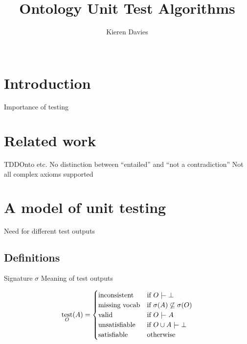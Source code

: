 \documentclass[draft]{sig-alternate}
\newcommand{\union}{\cup}
\newcommand{\sementails}{\mathrel{|}\joinrel\mkern-.5mu\mathrel{-}}
\newcommand{\signature}{\sigma}
\DeclareMathOperator{\test}{test}
\begin{document}
\title{Ontology Unit Test Algorithms}
\author{
  \alignauthor
  Kieren Davies\\
   \\
}
\maketitle


\section{Introduction}

\begin{todos}
  \todo Importance of testing
\end{todos}

\section{Related work}

\begin{todos}
  \todo TDDOnto etc.
  \todo No distinction between ``entailed'' and ``not a contradiction''
  \todo Not all complex axioms supported
\end{todos}

\section{A model of unit testing}

\begin{todos}
  \todo Need for different test outputs
\end{todos}

\subsection{Definitions}

\begin{todos}
  \todo Signature $\signature$
  \todo Meaning of test outputs
\end{todos}

\[
  \test_O(A) =
  \begin{cases}
    \text{inconsistent} &
      \text{if } O \sementails \bot \\
    \text{missing vocab} &
      \text{if } \signature(A) \not\subseteq \signature(O) \\
    \text{valid} &
      \text{if } O \sementails A \\
    \text{unsatisfiable} &
      \text{if } O \union A \sementails \bot \\
    \text{satisfiable} &
      \text{otherwise}
  \end{cases}
\]
\end{document}
